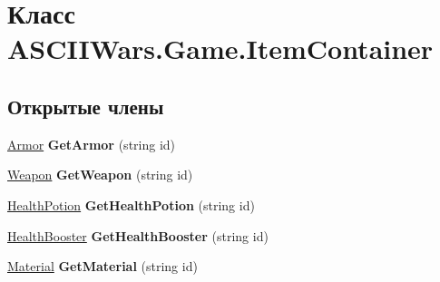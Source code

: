 \hypertarget{class_a_s_c_i_i_wars_1_1_game_1_1_item_container}{}\section{Класс A\+S\+C\+I\+I\+Wars.\+Game.\+Item\+Container}
\label{class_a_s_c_i_i_wars_1_1_game_1_1_item_container}
\subsection*{Открытые члены}
\begin{DoxyCompactItemize}
\item 
\hypertarget{class_a_s_c_i_i_wars_1_1_game_1_1_item_container_a4aa8a9dc347ac6b8b24486567110c802}{}\label{class_a_s_c_i_i_wars_1_1_game_1_1_item_container_a4aa8a9dc347ac6b8b24486567110c802} 
\hyperlink{class_a_s_c_i_i_wars_1_1_game_1_1_armor}{Armor} {\bfseries Get\+Armor} (string id)
\item 
\hypertarget{class_a_s_c_i_i_wars_1_1_game_1_1_item_container_aae0cb532c9242a5673e80eaff7b3edbd}{}\label{class_a_s_c_i_i_wars_1_1_game_1_1_item_container_aae0cb532c9242a5673e80eaff7b3edbd} 
\hyperlink{class_a_s_c_i_i_wars_1_1_game_1_1_weapon}{Weapon} {\bfseries Get\+Weapon} (string id)
\item 
\hypertarget{class_a_s_c_i_i_wars_1_1_game_1_1_item_container_a449041c4df0b261569597be88277d92b}{}\label{class_a_s_c_i_i_wars_1_1_game_1_1_item_container_a449041c4df0b261569597be88277d92b} 
\hyperlink{class_a_s_c_i_i_wars_1_1_game_1_1_health_potion}{Health\+Potion} {\bfseries Get\+Health\+Potion} (string id)
\item 
\hypertarget{class_a_s_c_i_i_wars_1_1_game_1_1_item_container_aa70c43020c6a423188df77bd7087feb1}{}\label{class_a_s_c_i_i_wars_1_1_game_1_1_item_container_aa70c43020c6a423188df77bd7087feb1} 
\hyperlink{class_a_s_c_i_i_wars_1_1_game_1_1_health_booster}{Health\+Booster} {\bfseries Get\+Health\+Booster} (string id)
\item 
\hypertarget{class_a_s_c_i_i_wars_1_1_game_1_1_item_container_a75b28ef2b5ae3acfceeb787c95eeb34b}{}\label{class_a_s_c_i_i_wars_1_1_game_1_1_item_container_a75b28ef2b5ae3acfceeb787c95eeb34b} 
\hyperlink{class_a_s_c_i_i_wars_1_1_game_1_1_material}{Material} {\bfseries Get\+Material} (string id)
\end{DoxyCompactItemize}
